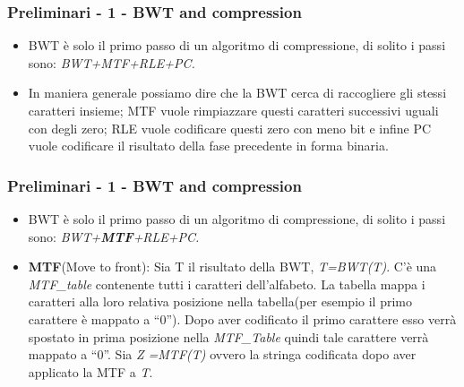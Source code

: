 \documentclass{beamer}
\begin{document}
\begin{frame}
 \frametitle{Preliminari - 1 - BWT and compression}
 \begin{itemize}
 	\item BWT è solo il primo passo di un algoritmo di compressione, di solito i passi sono: \textit{BWT+MTF+RLE+PC.}\pause
 	\item In maniera generale possiamo dire che la BWT cerca di raccogliere gli stessi caratteri insieme; MTF vuole rimpiazzare questi caratteri successivi uguali con degli zero; RLE vuole codificare questi zero con meno bit e infine PC vuole codificare il risultato della fase precedente in forma binaria. 
 \end{itemize}
\end{frame}

\begin{frame}
\frametitle{Preliminari - 1 - BWT and compression}
	\begin{itemize}
		\item BWT è solo il primo passo di un algoritmo di compressione, di solito i passi sono: \textit{BWT+\textbf{MTF}+RLE+PC.}\pause
		\item \textbf{MTF}(Move to front): Sia T il risultato della BWT, \textit{T=BWT(T)}. C'è una \textit{MTF\_table} contenente tutti i caratteri dell'alfabeto. La tabella mappa i caratteri alla loro relativa posizione nella tabella(per esempio il primo carattere è mappato a ``0''). Dopo aver codificato il primo carattere esso verrà spostato in prima posizione nella \textit{MTF\_Table} quindi tale carattere verrà mappato a ``0''. Sia \textit{Z =MTF(T)} ovvero la stringa codificata dopo aver applicato la MTF a \textit{T}.
	\end{itemize}
\end{frame}
\end{document}
